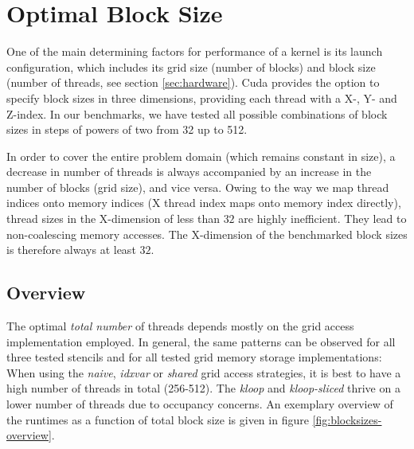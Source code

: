 \section{Optimal Block Size} \label{sec:res-blocksize}



One of the main determining factors for performance of a kernel is its launch configuration, which includes its grid size (number of blocks) and block size (number of threads, see section \ref{sec:hardware}). Cuda provides the option to specify block sizes in three dimensions, providing each thread with a X-, Y- and Z-index. In our benchmarks, we have tested all possible combinations of block sizes in steps of powers of two from 32 up to 512.

In order to cover the entire problem domain (which remains constant in size), a decrease in number of threads is always accompanied by an increase in the number of blocks (grid size), and vice versa. Owing to the way we map thread indices onto memory indices (X thread index maps onto memory index directly), thread sizes in the X-dimension of less than $32$ are highly inefficient. They lead to non-coalescing memory accesses. The X-dimension of the benchmarked block sizes is therefore always at least $32$.

\subsection{Overview}

The optimal \emph{total number} of threads depends mostly on the grid access implementation employed. In general, the same patterns can be observed for all three tested stencils and for all tested grid memory storage implementations: When using the \emph{naive}, \emph{idxvar} or \emph{shared} grid access strategies, it is best to have a high number of threads in total (256-512). The \emph{kloop} and \emph{kloop-sliced} thrive on a lower number of threads due to occupancy concerns. An exemplary overview of the runtimes as a function of total block size is given in figure \ref{fig:blocksizes-overview}.

